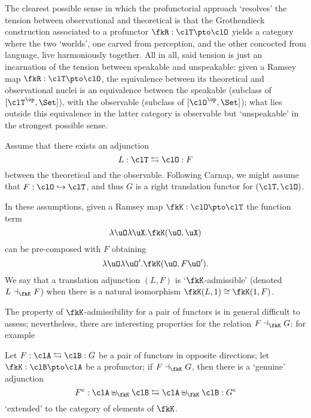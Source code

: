 \begin{remark}\label{resoudre_la_tension}
	The clearest possible sense in which the profunctorial approach `resolves' the tension between observational and theoretical is that the Gro\-then\-dieck construction associated to a profunctor $\fkR : \clT \pto \clO$ yields a category where the two `worlds', one carved from perception, and the other concocted from language, live harmoniously together. All in all, said tension is just an incarnation of the tension between speakable and unspeakable: given a Ramsey map $\fkR : \clT \pto \clO$, the equivalence between its theoretical and observational nuclei is an equivalence between the speakable (subclass of $[\clT^\op,\Set]$), with the observable (subclass of $[\clO^\op,\Set]$); what lies outside this equivalence in the latter category is observable but `unspeakable' in the strongest possible sense.
\end{remark}

\begin{remark}\label{carnap_translation_functors}
	Assume that there exists an adjunction 
	\[ 
		L : \clT \leftrightarrows \clO : F
	\]
	between the theoretical and the observable. Following Carnap, we might assume that $F : \clO \hookrightarrow \clT$, and thus $G$ is a right translation functor for $(\clT, \clO)$.

	In these assumptions, given a Ramsey map $\fkK : \clO \pto\clT$ the function term
	\[\lambda \uO\lambda\uX . \fkK(\uO, \uX)\]
	can be pre-composed with $F$ obtaining
	\[\lambda \uO\lambda\uO'.\fkK(\uO, F\uO').\]
	We say that a translation adjunction $(L,F)$ is `$\fkK$-admissible' (denoted $L \dashv_\fkK F$) when there is a natural isomorphism $\fkK(L,1)\cong\fkK(1,F)$.
\end{remark}
The property of $\fkK$-admissibility for a pair of functors is in general difficult to assess; nevertheless, there are interesting properties for the relation $F\dashv_\fkK G$: for example
\begin{theorem}
	Let $F : \clA \leftrightarrows \clB: G$ be a pair of functors in opposite directions; let $\fkK : \clB \pto \clA$ be a profunctor; if $F\dashv_\fkK G$, then there is a `genuine' adjunction 
	\[ F^e : \clA\uplus_\fkK\clB \leftrightarrows \clA\uplus_\fkK\clB : G^e \]
	`extended' to the category of elements of $\fkK$.
\end{theorem}